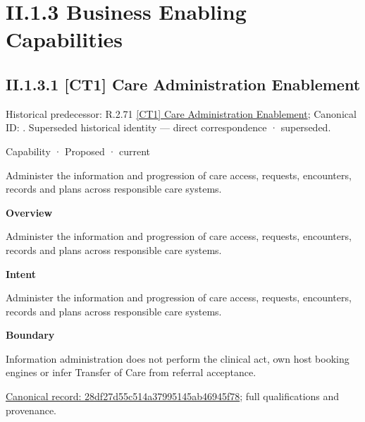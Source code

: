 \section*{II.1.3 Business Enabling Capabilities}
\label{navigation:II.1.3}

\subsection*{II.1.3.1 [CT1] Care Administration Enablement}
\label{navigation:II.1.3.1}

{\small Historical predecessor: R.2.71 \hyperref[element:b611a1fcfadb4b30af9ba74a4c993d8a]{[CT1] Care Administration Enablement}; Canonical ID: \texttt{}. Superseded historical identity — direct correspondence · superseded.}\par
\label{element:28df27d55c514a37995145ab46945f78}
{\small Capability · Proposed · current}\par

Administer the information and progression of care access, requests, encounters, records and plans across responsible care systems.



\textbf{Overview}



Administer the information and progression of care access, requests, encounters, records and plans across responsible care systems.



\textbf{Intent}



Administer the information and progression of care access, requests, encounters, records and plans across responsible care systems.



\textbf{Boundary}



Information administration does not perform the clinical act, own host booking engines or infer Transfer of Care from referral acceptance.


{\footnotesize \href{../../../../../../../continuum/strategy/capability/28df27d55c514a37995145ab46945f78.md}{Canonical record: 28df27d55c514a37995145ab46945f78}; full qualifications and provenance.}\par
